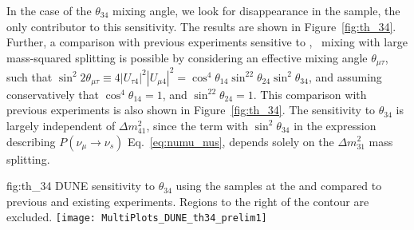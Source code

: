 In the case of the $\theta_{34}$ mixing angle, we look for disappearance in the  sample, the only contributor to this sensitivity. The results are shown in Figure~\ref{fig:th_34}. Further, a comparison with previous experiments sensitive to \numu, \nutau~mixing with large mass-squared splitting is possible by considering an effective mixing angle $\theta_{\mu\tau}$, such that $\sin^2{2\theta_{\mu\tau}}\equiv 4|U_{\tau4}|^2|U_{\mu 4}|^2=\cos^4\theta_{14}\sin^22\theta_{24}\sin^2\theta_{34}$, and assuming conservatively that $\cos^4\theta_{14}=1$, and $\sin^22\theta_{24}=1$. This comparison with previous experiments is also shown in Figure~\ref{fig:th_34}.
The sensitivity to $\theta_{34}$ is largely independent of 
$\Delta m^2_{41}$, since the term with $\sin^2\theta_{34}$ in the expression describing $P(\nu_{\mu} \rightarrow \nu_s)$ Eq.~\ref{eq:numu_nus}, depends solely on the $\Delta m^2_{31}$ mass splitting.

\begin{dunefigure} {fig:th_34} 
{DUNE sensitivity to $\theta_{34}$ using the  samples at the  and  compared to previous and existing experiments. Regions to the right of the contour are excluded.}
\texttt{[image: MultiPlots\_DUNE\_th34\_prelim1]}
\end{dunefigure}



